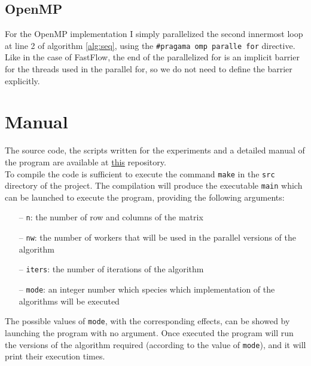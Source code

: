 \documentclass[12pt]{article}
\begin{document}
	\subsection{OpenMP}
	For the OpenMP implementation I simply parallelized the second innermost loop at line 2 of algorithm \ref{alg:seq}, using the \verb|#pragama omp paralle for| directive. Like in the case of FastFlow, the end of the parallelized for is an implicit barrier for the threads used in the parallel for, so we do not need to define the barrier explicitly.  
	\section{Manual}
	The source code, the scripts written for the experiments and a detailed manual of the program are available at \href{https://github.com/DiegoArcelli/Parallel-And-Distributed-Systems-Project}{this} repository.\\ 
	To compile the code is sufficient to execute the command \verb*|make| in the \verb*|src| directory of the project. The compilation will produce the executable \verb*|main| which can be launched to execute the program, providing the following arguments:
	\begin{itemize}
		\item[--] \verb|n|: the number of row and columns of the matrix
		\item[--] \verb|nw|: the number of workers that will be used in the parallel versions of the algorithm
		\item[--] \verb|iters|: the number of iterations of the algorithm
		\item[--] \verb|mode|: an integer number which species which implementation of the algorithms will be executed
	\end{itemize} 
	The possible values of \verb|mode|, with the corresponding effects, can be showed by launching the program with no argument. Once executed the program will run the versions of the algorithm required (according to the value of \verb|mode|), and it will print their execution times. 
	
\end{document}
